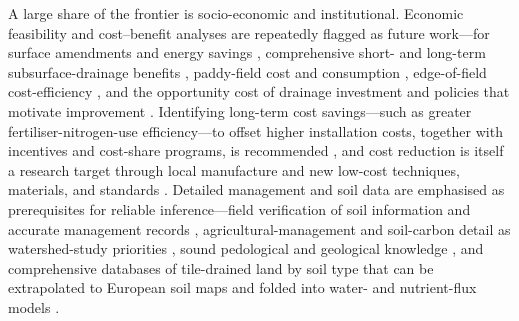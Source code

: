 \documentclass[11pt]{article}
\begin{document}
A large share of the frontier is socio-economic and institutional. Economic
feasibility and cost--benefit analyses are repeatedly flagged as future
work---for surface amendments and energy savings \parencite{Wamono2016b},
comprehensive short- and long-term subsurface-drainage benefits
\parencite{Guo2025}, paddy-field cost and consumption \parencite{Jia2023},
edge-of-field cost-efficiency \parencite{Mendes2020}, and the opportunity cost of
drainage investment and policies that motivate improvement
\parencite{Wichelns2002,THOMAS1995,Kladivko2005,Saadat2017,Manik2019,Helmers2012}.
Identifying long-term cost savings---such as greater fertiliser-nitrogen-use
efficiency---to offset higher installation costs, together with incentives and
cost-share programs, is recommended \parencite{Castellano2019,Sunohara2015}, and
cost reduction is itself a research target through local manufacture and new
low-cost techniques, materials, and standards \parencite{Datta2002,Yannopoulos2020}.
Detailed management and soil data are emphasised as prerequisites for reliable
inference---field verification of soil information and accurate management records
\parencite{JORJANI1991}, agricultural-management and soil-carbon detail as
watershed-study priorities \parencite{Williams2017}, sound pedological and
geological knowledge \parencite{Jacobsen2007}, and comprehensive databases of
tile-drained land by soil type that can be extrapolated to European soil maps and
folded into water- and nutrient-flux models
\parencite{Hirt2005,Hirt2005b,Hirt2011}.
\end{document}
